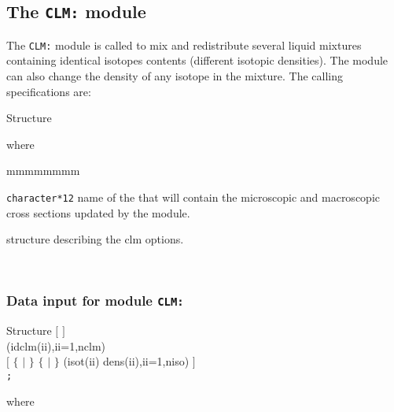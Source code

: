 \subsection{The {\tt CLM:} module}\label{sect:CLMData}

The {\tt CLM:} module is called to mix and redistribute several liquid mixtures containing identical isotopes contents (different isotopic densities). The module can also change the density of any isotope in the mixture. The calling specifications are:

\begin{DataStructure}{Structure }
 \moc{:=}     \moc{::} 
\end{DataStructure}

\noindent
where

\begin{ListeDeDescription}{mmmmmmmm}

\item[\dusa{MICLIB}] {\tt character*12} name of the  that will
contain the microscopic and macroscopic cross sections updated by the
module. 

\item[\dstr{descclm}] structure describing the clm options.

\end{ListeDeDescription}

\
\subsubsection{Data input for module {\tt CLM:}}\label{sect:descclm}

\begin{DataStructure}{Structure }
$[$   $]$ \\
 (idclm(ii),ii=1,nclm) \\
$[$ $\{$  $|$  $\}$ $\{$  $|$  $\}$ (isot(ii) dens(ii),ii=1,niso) $]$ \\
{\tt ;}
\end{DataStructure}
\noindent
where

